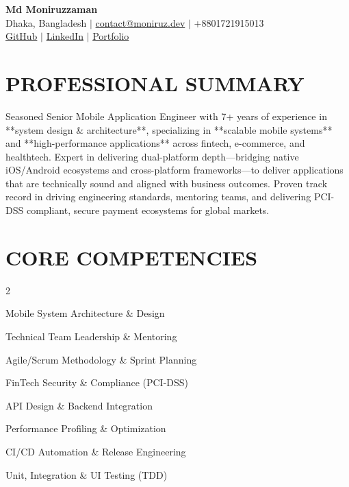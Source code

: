\documentclass[10pt,a4paper]{article}
\begin{document}
\begin{center}
    {\LARGE \textbf{Md Moniruzzaman}} \\
    \vspace{4pt}
    Dhaka, Bangladesh $|$ \href{mailto:contact@moniruz.dev}{contact@moniruz.dev} $|$ +8801721915013 \\
    \href{https://github.com/filelucker}{GitHub} $|$ \href{https://www.linkedin.com/in/mon000/}{LinkedIn} $|$ \href{https://moniruz.dev/}{Portfolio} \\
    \vspace{2pt}
\end{center}

\section*{PROFESSIONAL SUMMARY}
Seasoned Senior Mobile Application Engineer with 7+ years of experience in **system design \& architecture**, specializing in **scalable mobile systems** and **high-performance applications** across fintech, e-commerce, and healthtech. Expert in delivering dual-platform depth—bridging native iOS/Android ecosystems and cross-platform frameworks—to deliver applications that are technically sound and aligned with business outcomes. Proven track record in driving engineering standards, mentoring teams, and delivering PCI-DSS compliant, secure payment ecosystems for global markets.

\section*{CORE COMPETENCIES}
\begin{itemize}
    \begin{multicols}{2}
        \item Mobile System Architecture \& Design
        \item Technical Team Leadership \& Mentoring
        \item Agile/Scrum Methodology \& Sprint Planning
        \item FinTech Security \& Compliance (PCI-DSS)
        \item API Design \& Backend Integration
        \item Performance Profiling \& Optimization
        \item CI/CD Automation \& Release Engineering
        \item Unit, Integration \& UI Testing (TDD)
    \end{multicols}
\end{itemize}
\end{document}
